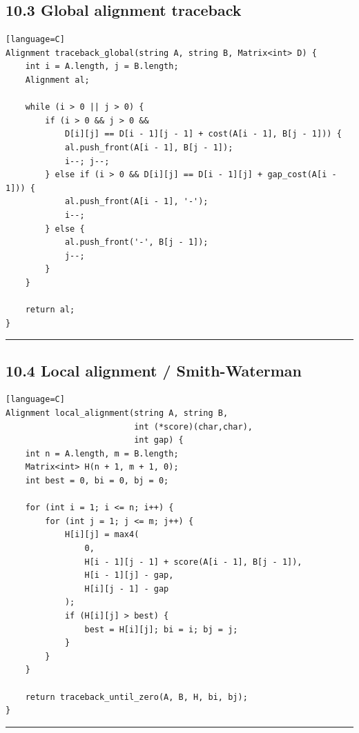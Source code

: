 \documentclass[11pt]{article}
\begin{document}
\subsection{10.3 Global alignment traceback}\label{global-alignment-traceback}

\begin{verbatim}[language=C]
Alignment traceback_global(string A, string B, Matrix<int> D) {
    int i = A.length, j = B.length;
    Alignment al;

    while (i > 0 || j > 0) {
        if (i > 0 && j > 0 &&
            D[i][j] == D[i - 1][j - 1] + cost(A[i - 1], B[j - 1])) {
            al.push_front(A[i - 1], B[j - 1]);
            i--; j--;
        } else if (i > 0 && D[i][j] == D[i - 1][j] + gap_cost(A[i - 1])) {
            al.push_front(A[i - 1], '-');
            i--;
        } else {
            al.push_front('-', B[j - 1]);
            j--;
        }
    }

    return al;
}
\end{verbatim}

\begin{center}\rule{0.5\linewidth}{0.5pt}\end{center}

\subsection{10.4 Local alignment / Smith-Waterman}\label{local-alignment-smith-waterman}

\begin{verbatim}[language=C]
Alignment local_alignment(string A, string B,
                          int (*score)(char,char),
                          int gap) {
    int n = A.length, m = B.length;
    Matrix<int> H(n + 1, m + 1, 0);
    int best = 0, bi = 0, bj = 0;

    for (int i = 1; i <= n; i++) {
        for (int j = 1; j <= m; j++) {
            H[i][j] = max4(
                0,
                H[i - 1][j - 1] + score(A[i - 1], B[j - 1]),
                H[i - 1][j] - gap,
                H[i][j - 1] - gap
            );
            if (H[i][j] > best) {
                best = H[i][j]; bi = i; bj = j;
            }
        }
    }

    return traceback_until_zero(A, B, H, bi, bj);
}
\end{verbatim}

\begin{center}\rule{0.5\linewidth}{0.5pt}\end{center}
\end{document}

